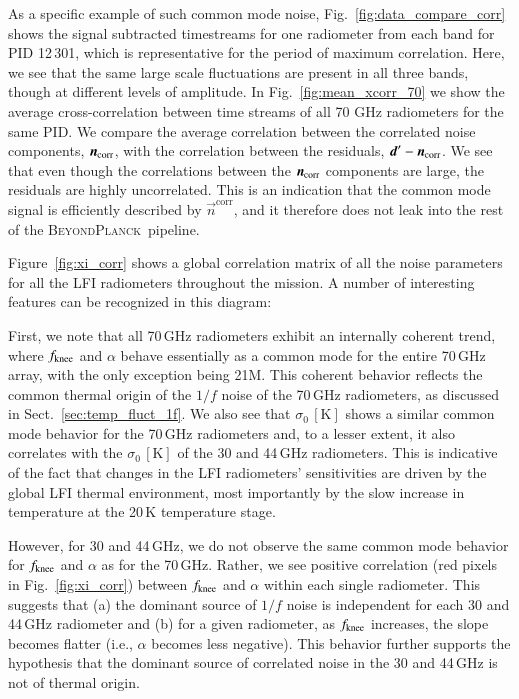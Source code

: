 \documentclass{aa}
\renewcommand{\d}[0]{\vec{d}}
\newcommand{\n}[0]{\vec{n}}
\newcommand{\BP}{\textsc{BeyondPlanck}}
\begin{document}
As a specific example of such common mode noise,
Fig.~\ref{fig:data_compare_corr} shows the signal subtracted
timestreams for one radiometer from each band for PID 12\,301, which
is representative for the period of maximum correlation. Here, we
see that the same large scale fluctuations are present in all
three bands, though at different levels of amplitude. In 
Fig.~\ref{fig:mean_xcorr_70} we show the average cross-correlation 
between time streams of all 70 GHz radiometers for the
same PID. We compare the average correlation between the correlated
noise components, $\n_{\rm corr}$, with the correlation between the
residuals, $\d'-\n_{\rm corr}$. We see that even though the
correlations between the $\n_{\rm corr}$ components are large, the
residuals are highly uncorrelated. This is an indication that the
common mode signal is efficiently described by $\n^{\mathrm{corr}}$,
and it therefore does not leak into the rest of the \BP\ pipeline.

Figure~\ref{fig:xi_corr} shows a global correlation matrix of all the noise
parameters for all the LFI radiometers throughout the mission.
A number of interesting features can be recognized in this diagram:

       
        First, we note that all 70\,GHz radiometers exhibit an internally coherent trend, where $f_{\rm knee}$ and $\alpha$ behave essentially as a common mode for the entire 70\,GHz array, with the only exception being 21M. This coherent behavior reflects the common thermal origin of the $1/f$ noise of the 70\,GHz radiometers, as discussed in Sect.~\ref{sec:temp_fluct_1f}. We also see that $\sigma_0 \,\mathrm{[K]}$ shows a similar common mode behavior for the 70\,GHz radiometers and, to a lesser extent, it also correlates with the $\sigma_0 \,\mathrm{[K]}$ of the 30 and 44\,GHz radiometers. This is indicative of the fact that changes in the LFI radiometers’ sensitivities are driven by the global LFI thermal environment, most importantly by the slow increase in temperature at the 20\,K temperature stage.
        
        
        However, for 30 and 44\,GHz, we do not observe the same common mode behavior for
        $f_{\rm knee}$ and $\alpha$ as for the 70\,GHz. Rather, we see positive
        correlation (red pixels in Fig.~\ref{fig:xi_corr}) between $f_{\rm
        knee}$ and $\alpha$ within each single radiometer. This suggests that
        (a) the dominant source of $1/f$ noise is independent for each 30 and
        44\,GHz radiometer and (b) for a given radiometer, as $f_{\rm knee}$
        increases, the slope becomes flatter (i.e., $\alpha$ becomes less negative). This behavior further supports the hypothesis that the dominant source of correlated noise in the 30 and 44\,GHz is not of thermal origin.
        
\end{document}
